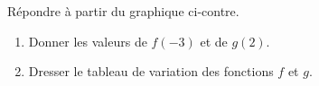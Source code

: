 
\begin{exercice}\label{exoSeconde-0072}


    \begin{multicols}{2}
        \begin{center}
            
        \end{center}

        \columnbreak

        Répondre à partir du graphique ci-contre.
        \begin{enumerate}
            \item
                Donner les valeurs de \( f(-3)\) et de \( g(2)\).
            \item
                Dresser le tableau de variation des fonctions \( f\) et \( g\).
        \end{enumerate}

    \end{multicols}

\end{exercice}
